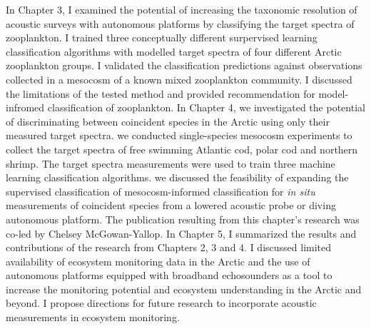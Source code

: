 In Chapter 3, I examined the potential of increasing the taxonomic resolution of acoustic surveys with autonomous platforms by classifying the target spectra of zooplankton. I trained three conceptually different surpervised learning classification algorithms with modelled target spectra of four different Arctic zooplankton groups. I validated the classification predictions against observations collected in a mesocosm of a known mixed zooplankton community. I discussed the limitations of the tested method and provided recommendation for model-infromed classification of zooplankton.
In Chapter 4, we investigated the potential of discriminating between coincident species in the Arctic using only their measured target spectra. we conducted single-species mesocosm experiments to collect the target spectra of free swimming Atlantic cod, polar cod and northern shrimp. The target spectra measurements were used to train three machine learning classification algorithms. we discussed the feasibility of expanding the supervised classification of mesocosm-informed classification for \textit{in situ} measurements of coincident species from a lowered acoustic probe or diving autonomous platform. The publication resulting from this chapter's research was co-led by Chelsey McGowan-Yallop.
In Chapter 5, I summarized the results and contributions of the research from Chapters 2, 3 and 4. I discussed limited availability of ecosystem monitoring data in the Arctic and the use of autonomous platforms equipped with broadband echosounders as a tool to increase the monitoring potential and ecosystem understanding in the Arctic and beyond. I propose directions for future research to incorporate acoustic measurements in ecosystem monitoring.





